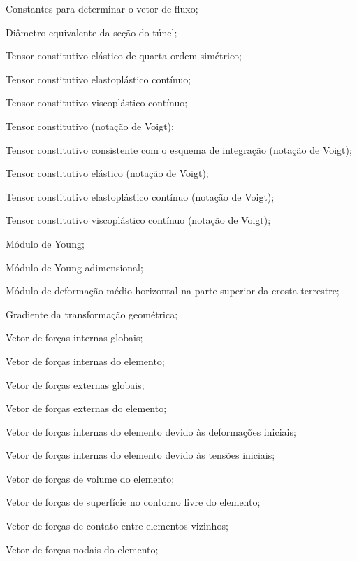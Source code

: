 \item[$c_1, c_2, c_3$]	Constantes para determinar o vetor de fluxo;
\item[$D$]				Diâmetro equivalente da seção do túnel;
\item[$\Dllll$] Tensor constitutivo elástico de quarta ordem simétrico;
\item[$\Dllll^{ep}$] Tensor constitutivo elastoplástico contínuo;
\item[$\Dllll^{vp}$] Tensor constitutivo viscoplástico contínuo;
\item[$\Dll$] Tensor constitutivo (notação de Voigt);
\item[$\Dll^{alg}$] Tensor constitutivo consistente com o esquema de integração (notação de Voigt);
\item[$\Dll^{e}$] Tensor constitutivo elástico (notação de Voigt);
\item[$\Dll^{ep}$] Tensor constitutivo elastoplástico contínuo (notação de Voigt);
\item[$\Dll^{vp}$] Tensor constitutivo viscoplástico contínuo (notação de Voigt);
\item[$E$]				Módulo de Young;
\item[$E^*$]			Módulo de Young adimensional;
\item[$E_h$]			Módulo de deformação médio horizontal na parte superior da crosta terrestre;
\item[$\Fll$]			Gradiente da transformação geométrica;
\item[$\Fl_{int}$]			Vetor de forças internas globais;
\item[$\Fl_{int_e}$]			Vetor de forças internas do elemento;
\item[$\Fl_{ext}$]			Vetor de forças externas globais;
\item[$\Fl_{ext_e}$]			Vetor de forças externas do elemento;
\item[$\Fl_{\varepsilon_{0_e}}$]	Vetor de forças internas do elemento devido às deformações iniciais;
\item[$\Fl_{\sigma_{0_e}}$]	Vetor de forças internas do elemento devido às tensões iniciais;
\item[$\Fl_{V_e}$]	Vetor de forças de volume do elemento;
\item[$\Fl_{S_e}$]	Vetor de forças de superfície no contorno livre do elemento;
\item[$\Fl_{C_e}$]	Vetor de forças de contato entre elementos vizinhos;
\item[$\Fl_{N_e}$]	Vetor de forças nodais do elemento;

